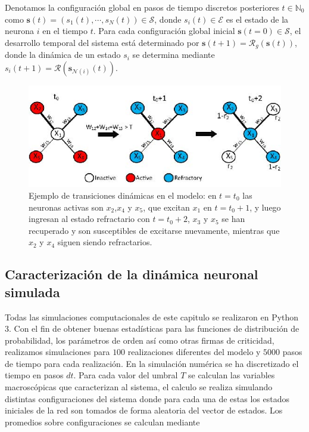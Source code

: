 Denotamos la configuración global en pasos de tiempo discretos posteriores $t \in \mathbb{N}_0$ como $\mathbf{s}(t) = (s_1(t),\cdots , s_N(t))\in \mathcal{S}$, donde $s_i(t) \in \mathcal{E}$ es el estado de la neurona $i$ en el tiempo $t$.  Para cada configuración global inicial  $\mathbf{s} (t=0) \in \mathcal{S}$, el desarrollo temporal del sistema está determinado por $\mathbf{s}(t+1)=\mathcal{R}_g(\mathbf{s}(t))$, donde la dinámica de un estado $s_i$ se determina mediante $s_i(t+1)=\mathcal{R}\left(\mathbf{s}_{\mathcal{N}(i)}(t)\right)$.


\begin{figure}[h!]
	\centering\includegraphics[width=\imsize]{modelopasos}
	\caption[Ejemplo de transiciones dinámicas en el modelo.]{Ejemplo de transiciones dinámicas en el modelo: en $t = t_0$ las neuronas activas son $x_2$,$x_4$ y $x_5$, que excitan $x_1$ en $t = t_0 + 1$, y luego ingresan al estado refractario con $t = t_0 + 2$, $x_3$ y $x_5$ se han recuperado y son susceptibles de excitarse nuevamente,
		mientras que $x_2$ y $x_4$ siguen siendo refractarios.} \label{fig:modelopasos}
\end{figure}





\subsection{Caracterización de la dinámica neuronal simulada}

Todas las simulaciones computacionales de este capitulo se realizaron en Python 3. Con el fin de obtener buenas estadísticas para las funciones de distribución de probabilidad, los parámetros de orden así como otras firmas de criticidad,  realizamos simulaciones para $100$ realizaciones diferentes del modelo  y $5000$ pasos de tiempo para cada realización. En la simulación numérica se ha discretizado el tiempo en pasos $dt$.  Para cada valor del umbral $T$  se calculan las variables macroscópicas que caracterizan al sistema,  el calculo se realiza simulando distintas configuraciones del sistema  donde para cada una de estas  los estados iniciales de la red son  tomados de forma aleatoria del vector de estados.     Los promedios sobre configuraciones se calculan  mediante

